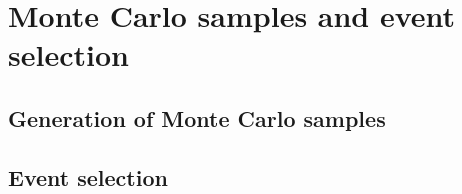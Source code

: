 \chapter{Monte Carlo samples and event selection}
\section{Generation of Monte Carlo samples}
\section{Event selection}